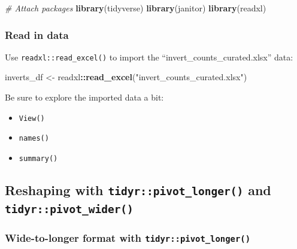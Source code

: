 \documentclass[]{book}
\newenvironment{Shaded}{\begin{snugshade}}{\end{snugshade}}
\newcommand{\CommentTok}[1]{\textcolor[rgb]{0.56,0.35,0.01}{\textit{#1}}}
\newcommand{\KeywordTok}[1]{\textcolor[rgb]{0.13,0.29,0.53}{\textbf{#1}}}
\newcommand{\NormalTok}[1]{#1}
\newcommand{\OperatorTok}[1]{\textcolor[rgb]{0.81,0.36,0.00}{\textbf{#1}}}
\newcommand{\StringTok}[1]{\textcolor[rgb]{0.31,0.60,0.02}{#1}}
\providecommand{\tightlist}{%
  \setlength{\itemsep}{0pt}\setlength{\parskip}{0pt}}
\begin{document}
\begin{Shaded}
\begin{Highlighting}[]
\CommentTok{# Attach packages}
\KeywordTok{library}\NormalTok{(tidyverse)}
\KeywordTok{library}\NormalTok{(janitor)}
\KeywordTok{library}\NormalTok{(readxl)}
\end{Highlighting}
\end{Shaded}

\hypertarget{read-in-data}{%
\subsubsection{Read in data}\label{read-in-data}}

Use \texttt{readxl::read\_excel()} to import the ``invert\_counts\_curated.xlsx'' data:

\begin{Shaded}
\begin{Highlighting}[]
\NormalTok{inverts_df <-}\StringTok{ }\NormalTok{readxl}\OperatorTok{::}\KeywordTok{read_excel}\NormalTok{(}\StringTok{"invert_counts_curated.xlsx"}\NormalTok{)}
\end{Highlighting}
\end{Shaded}

Be sure to explore the imported data a bit:

\begin{itemize}
\tightlist
\item
  \texttt{View()}
\item
  \texttt{names()}
\item
  \texttt{summary()}
\end{itemize}

\hypertarget{reshaping-with-tidyrpivot_longer-and-tidyrpivot_wider}{%
\subsection{\texorpdfstring{Reshaping with \texttt{tidyr::pivot\_longer()} and \texttt{tidyr::pivot\_wider()}}{Reshaping with tidyr::pivot\_longer() and tidyr::pivot\_wider()}}\label{reshaping-with-tidyrpivot_longer-and-tidyrpivot_wider}}

\hypertarget{wide-to-longer-format-with-tidyrpivot_longer}{%
\subsubsection{\texorpdfstring{Wide-to-longer format with \texttt{tidyr::pivot\_longer()}}{Wide-to-longer format with tidyr::pivot\_longer()}}\label{wide-to-longer-format-with-tidyrpivot_longer}}
\end{document}
